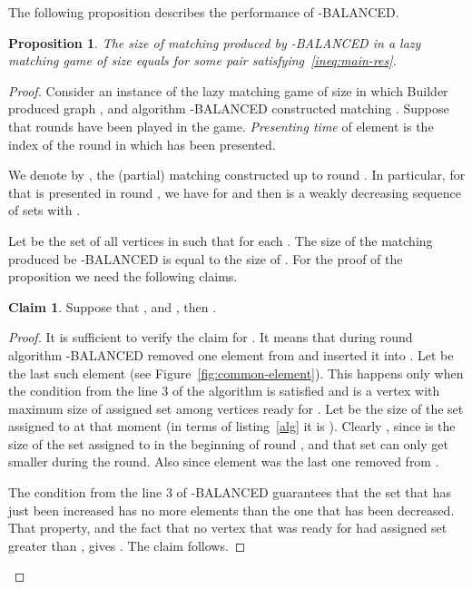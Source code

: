 \documentclass[12pt]{amsart}
\newtheorem{prop}[theorem]{Proposition}
\theoremstyle{definition}
\newtheorem{claim}[theorem]{Claim}
\newcommand{\Alg}[0]{\textsf{BALANCED}\xspace}
\newcommand{\Br}{Builder\xspace}
\begin{document}
The following proposition describes the performance of -\Alg{}. 
\begin{prop}\label{prop:balanced_bound}
 The size  of matching produced by -\Alg{} in a lazy matching game of size  equals  
 for some pair  satisfying~\eqref{ineq:main-res}.
\end{prop}
\begin{proof}
Consider an instance of the lazy matching game of size  in which \Br produced graph , and algorithm -\Alg{} constructed matching . 
Suppose that  rounds have been played in the game.
\emph{Presenting time} of element  is the index of the round in which  has been presented. 

We denote by , the (partial) matching constructed up to round . 
In particular, for  that is presented in round , we have  for  and then  is a weakly decreasing sequence of sets with . 

Let  be the set of all vertices in  such that  for each . 
The size of the matching produced be -\Alg{} is equal to the size of .
For the proof of the proposition we need the following claims. 
\begin{claim}
\label{claim:d1}
  Suppose that  ,  and , then . 
\end{claim}
\begin{proof}
It is sufficient to verify the claim for . 
It means that 
during round  algorithm -\Alg{} removed one element from  and inserted it into . 
Let  be the last such element (see Figure~\ref{fig:common-element}).
This happens only when the condition from the line 3 of the algorithm  is satisfied and   is a vertex with maximum size of assigned set among vertices ready for . 
Let  be the size of the set assigned to  at that moment  (in terms of listing~\ref{alg} it is ). 
Clearly , since  is the size of the set assigned to  in the beginning of round , and that set can only get smaller during the round. 
Also  since element  was the last one removed from .

The condition from the line 3 of -\Alg{} guarantees that the set that has just been increased has no more elements than the one that has been decreased. 
That property, and the fact that no vertex that was ready for  had assigned set greater than , gives . The claim follows.
\end{proof}

\usetikzlibrary{arrows,calc,shapes,decorations.pathreplacing}
\begin{figure}
\begin{center}
\begin{tikzpicture}


\end{tikzpicture}
\end{center}
\end{figure}
\end{proof}
\end{document}
